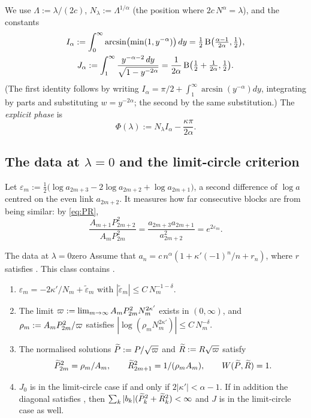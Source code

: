 We use $\Lambda:=\lambda/(2c)$, $N_\lambda:=\Lambda^{1/\alpha}$ (the position where
$2c\,N^\alpha=\lambda$), and the constants
\begin{equation}\label{eq:constants}
  \begin{gathered}
  I_\alpha:=\int_0^\infty\arcsin\bigl(\min(1,y^{-\alpha})\bigr)\,dy
  =\tfrac12\operatorname{B}\bigl(\tfrac{\alpha-1}{2\alpha},\tfrac12\bigr),\\
  J_\alpha:=\int_1^\infty\frac{y^{-\alpha-2}\,dy}{\sqrt{1-y^{-2\alpha}}}
  =\frac{1}{2\alpha}\operatorname{B}\bigl(\tfrac12+\tfrac1{2\alpha},\tfrac12\bigr).
  \end{gathered}
\end{equation}
(The first identity follows by writing $I_\alpha=\pi/2+\int_1^\infty\arcsin(y^{-\alpha})dy$,
integrating by parts and substituting $w=y^{-2\alpha}$; the second by the same
substitution.) The \emph{explicit phase} is
\begin{equation}\label{eq:Phi}
  \Phi(\lambda):=N_\lambda I_\alpha-\frac{\kappa\pi}{2\alpha}.
\end{equation}

\subsection{The data at \texorpdfstring{$\lambda=0$}{lambda = 0} and the limit-circle criterion}

Let $\varepsilon_m:=\tfrac12\bigl(\log a_{2m+3}-2\log a_{2m+2}+\log a_{2m+1}\bigr)$, a
second difference of $\log a$ centred on the even link $a_{2m+2}$. It measures how
far consecutive blocks are from being similar: by \eqref{eq:PR},
\begin{equation}\label{eq:rho-ratio}
  \frac{A_{m+1}P_{2m+2}^2}{A_mP_{2m}^2}
  =\frac{a_{2m+3}a_{2m+1}}{a_{2m+2}^2}=e^{2\varepsilon_m}.
\end{equation}

\begin{proposition}{The data at $\lambda=0$}{zero}
Assume that $a_n=c\,n^\alpha(1+\kappa'(-1)^n/n+r_n)$, where $r$ satisfies .
This class contains .
\begin{enumerate}
\item[(a)] $\varepsilon_m=-2\kappa'/N_m+\tilde\varepsilon_m$ with
  $|\tilde\varepsilon_m|\le C\,N_m^{-1-\delta}$.
\item[(b)] The limit $\varpi:=\lim_{m\to\infty}A_mP_{2m}^2N_m^{2\kappa'}$ exists in
  $(0,\infty)$, and $\rho_m:=A_mP_{2m}^2/\varpi$ satisfies
  $|\log(\rho_mN_m^{2\kappa'})|\le C\,N_m^{-\delta}$.
\item[(c)] The normalised solutions $\widetilde P:=P/\sqrt{\varpi}$ and $\widetilde R:=R\sqrt{\varpi}$ satisfy
  \[
    \widetilde P_{2m}^2=\rho_m/A_m,\qquad \widetilde R_{2m+1}^2=1/(\rho_mA_m),\qquad W(\widetilde P,\widetilde R)=1.
  \]
\item[(d)] $J_0$ is in the limit-circle case if and only if $2|\kappa'|<\alpha-1$. If in
  addition the diagonal satisfies , then
  $\sum_k|b_k|(\widetilde P_k^2+\widetilde R_k^2)<\infty$ and $J$ is in the limit-circle case as well.
\end{enumerate}
\end{proposition}

